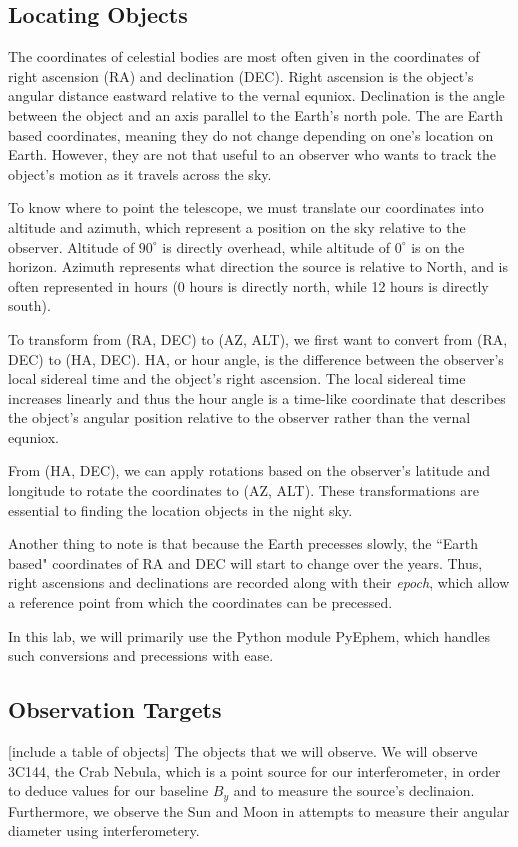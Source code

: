 \documentclass[12pt]{article}
\begin{document}
\subsection{Locating Objects}
The coordinates of celestial bodies are most often given in the coordinates of right ascension (RA) and declination (DEC). Right ascension is the object's angular distance eastward relative to the vernal equniox. Declination is the angle between the object and an axis parallel to the Earth's north pole. The are Earth based coordinates, meaning they do not change depending on one's location on Earth. However, they are not that useful to an observer who wants to track the object's motion as it travels across the sky.

To know where to point the telescope, we must translate our coordinates into altitude and azimuth, which represent a position on the sky relative to the observer. Altitude of $90^\circ$ is directly overhead, while altitude of $0^\circ$ is on the horizon. Azimuth represents what direction the source is relative to North, and is often represented in hours (0 hours is directly north, while 12 hours is directly south).

To transform from (RA, DEC) to (AZ, ALT), we first want to convert from (RA, DEC) to (HA, DEC). HA, or hour angle, is the difference between the observer's local sidereal time and the object's right ascension. The local sidereal time increases linearly and thus the hour angle is a time-like coordinate that describes the object's angular position relative to the observer rather than the vernal equniox.

From (HA, DEC), we can apply rotations based on the observer's latitude and longitude to rotate the coordinates to (AZ, ALT). These transformations are essential to finding the location objects in the night sky.

Another thing to note is that because the Earth precesses slowly, the ``Earth based" coordinates of RA and DEC will start to change over the years. Thus, right ascensions and declinations are recorded along with their \textit{epoch}, which allow a reference point from which the coordinates can be precessed.

In this lab, we will primarily use the Python module PyEphem, which handles such conversions and precessions with ease.
\subsection{Observation Targets}
[include a table of objects]
The objects that we will observe. We will observe 3C144, the Crab Nebula, which is a point source for our interferometer, in order to deduce values for our baseline $B_y$ and to measure the source's declinaion. Furthermore, we observe the Sun and Moon in attempts to measure their angular diameter using interferometery.
\end{document}
